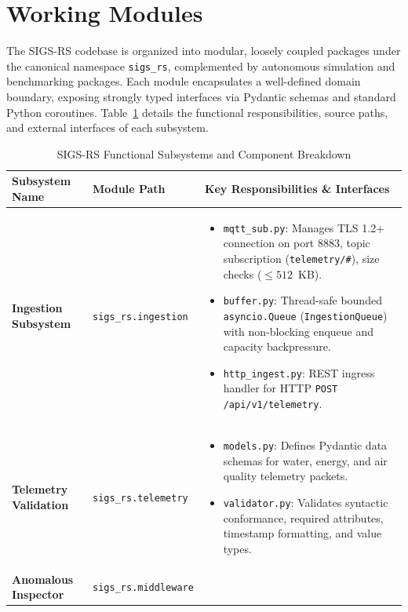 \section{Working Modules}

The SIGS-RS codebase is organized into modular, loosely coupled packages under the canonical namespace \texttt{sigs\_rs}, complemented by autonomous simulation and benchmarking packages. Each module encapsulates a well-defined domain boundary, exposing strongly typed interfaces via Pydantic schemas and standard Python coroutines. Table~\ref{tab:working_modules} details the functional responsibilities, source paths, and external interfaces of each subsystem.

\begin{table}[H]
\centering
\caption{SIGS-RS Functional Subsystems and Component Breakdown}
\label{tab:working_modules}
\small
\begin{tabularx}{\linewidth}{@{}p{3.2cm} p{3.5cm} X@{}}
\toprule
\textbf{Subsystem Name} & \textbf{Module Path} & \textbf{Key Responsibilities \& Interfaces} \\
\midrule
\textbf{Ingestion Subsystem} & \texttt{sigs\_rs.ingestion} & 
\begin{itemize}[leftmargin=*,noitemsep,topsep=0pt]
    \item \texttt{mqtt\_sub.py}: Manages TLS 1.2+ connection on port 8883, topic subscription (\texttt{telemetry/\#}), size checks ($\le 512$~KB).
    \item \texttt{buffer.py}: Thread-safe bounded \texttt{asyncio.Queue} (\texttt{IngestionQueue}) with non-blocking enqueue and capacity backpressure.
    \item \texttt{http\_ingest.py}: REST ingress handler for HTTP \texttt{POST /api/v1/telemetry}.
\end{itemize} \\
\midrule
\textbf{Telemetry Validation} & \texttt{sigs\_rs.telemetry} & 
\begin{itemize}[leftmargin=*,noitemsep,topsep=0pt]
    \item \texttt{models.py}: Defines Pydantic data schemas for water, energy, and air quality telemetry packets.
    \item \texttt{validator.py}: Validates syntactic conformance, required attributes, timestamp formatting, and value types.
\end{itemize} \\
\midrule
\textbf{Anomalous Inspector} & \texttt{sigs\_rs.middleware} & 
\begin{itemize}[leftmargin=*,noitemsep,topsep=0pt]

\end{itemize}
\end{tabularx}
\end{table}

